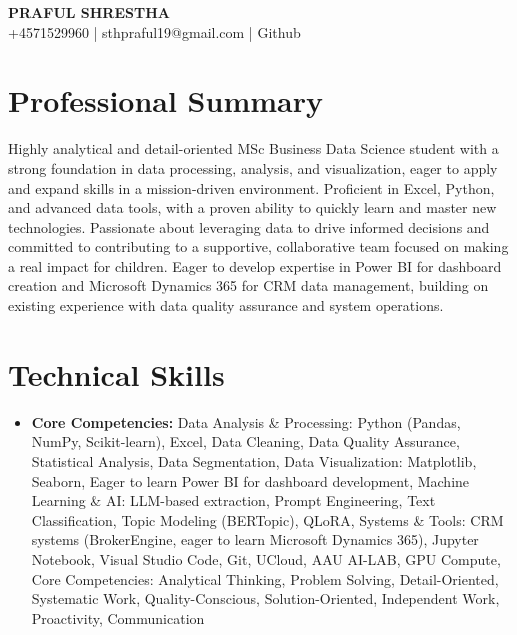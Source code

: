 \documentclass[10pt, letterpaper]{article}
\begin{document}
\begin{center}
    {\Huge \textbf{PRAFUL SHRESTHA}} \\ \vspace{4pt}
    +4571529960 | sthpraful19@gmail.com | Github
\end{center}

\section{Professional Summary}
Highly analytical and detail-oriented MSc Business Data Science student with a strong foundation in data processing, analysis, and visualization, eager to apply and expand skills in a mission-driven environment. Proficient in Excel, Python, and advanced data tools, with a proven ability to quickly learn and master new technologies. Passionate about leveraging data to drive informed decisions and committed to contributing to a supportive, collaborative team focused on making a real impact for children. Eager to develop expertise in Power BI for dashboard creation and Microsoft Dynamics 365 for CRM data management, building on existing experience with data quality assurance and system operations.

\section{Technical Skills}
\begin{itemize}[leftmargin=0.15in, label={}]
    \item \textbf{Core Competencies:} Data Analysis \& Processing: Python (Pandas, NumPy, Scikit-learn), Excel, Data Cleaning, Data Quality Assurance, Statistical Analysis, Data Segmentation, Data Visualization: Matplotlib, Seaborn, Eager to learn Power BI for dashboard development, Machine Learning \& AI: LLM-based extraction, Prompt Engineering, Text Classification, Topic Modeling (BERTopic), QLoRA, Systems \& Tools: CRM systems (BrokerEngine, eager to learn Microsoft Dynamics 365), Jupyter Notebook, Visual Studio Code, Git, UCloud, AAU AI-LAB, GPU Compute, Core Competencies: Analytical Thinking, Problem Solving, Detail-Oriented, Systematic Work, Quality-Conscious, Solution-Oriented, Independent Work, Proactivity, Communication
\end{itemize}

\end{document}
